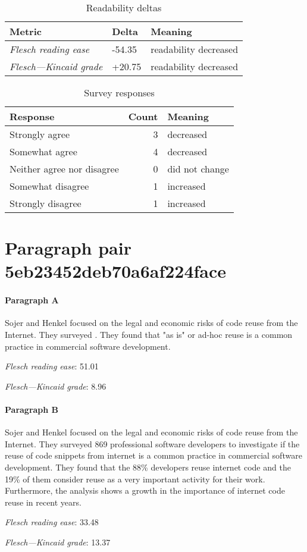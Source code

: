 \bigskip\begin{table}[!h]
\centering
\begin{tabular}{lll}
\toprule
               \textbf{Metric} & \textbf{Delta} &       \textbf{Meaning} \\
\midrule
    \emph{Flesch reading ease} &         -54.35 &  readability decreased \\
 \emph{Flesch---Kincaid grade} &         +20.75 &  readability decreased \\
\bottomrule
\end{tabular}
\caption*{Readability deltas}\end{table}

\begin{table}[!h]
\centering
\begin{tabular}{lrl}
\toprule
          \textbf{Response} &  \textbf{Count} & \textbf{Meaning} \\
\midrule
             Strongly agree &               3 &        decreased \\
             Somewhat agree &               4 &        decreased \\
 Neither agree nor disagree &               0 &   did not change \\
          Somewhat disagree &               1 &        increased \\
          Strongly disagree &               1 &        increased \\
\bottomrule
\end{tabular}
\caption*{Survey responses}\end{table}


\newpage
\section{Paragraph pair 5eb23452deb70a6af224face}
\paragraph{Paragraph A}
Sojer and Henkel focused on the legal and economic risks of code reuse from the Internet. They surveyed . They found that "as is" or ad-hoc reuse is a common practice in commercial software development.\par\medskip
\emph{Flesch reading ease}: 51.01\par
\emph{Flesch---Kincaid grade}: 8.96

\paragraph{Paragraph B}
Sojer and Henkel focused on the legal and economic risks of code reuse from the Internet. They surveyed 869 professional software developers to investigate if the reuse of code snippets from internet is a common practice in commercial software development. They found that the 88\% developers reuse internet code and the 19\% of them consider reuse as a very important activity for their work. Furthermore, the analysis shows a growth in the importance of internet code reuse in recent years.\par\medskip
\emph{Flesch reading ease}: 33.48\par
\emph{Flesch---Kincaid grade}: 13.37

